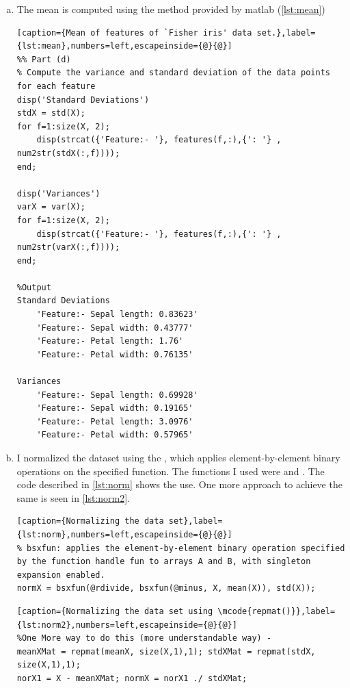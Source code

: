 \documentclass[a4paper, 11pt]{article}
\begin{document}
\begin{enumerate}[(a)]
\begin{lstlisting}[caption={Mean of features of `Fisher iris' data set.},label={lst:mean},numbers=left,escapeinside={@}{@}]
%Output
Mean
    'Feature:- Sepal length: 5.9001'
    'Feature:- Sepal width: 3.0989'
    'Feature:- Petal length: 3.8196'
    'Feature:- Petal width: 1.2526'
\end{lstlisting}

\item The mean is computed using the  method provided by matlab (\autoref{lst:mean})
\vspace{-20pt}
\begin{lstlisting}[caption={Mean of features of `Fisher iris' data set.},label={lst:mean},numbers=left,escapeinside={@}{@}]
%% Part (d)
% Compute the variance and standard deviation of the data points for each feature
disp('Standard Deviations')
stdX = std(X);
for f=1:size(X, 2);
    disp(strcat({'Feature:- '}, features(f,:),{': '} , num2str(stdX(:,f))));
end;

disp('Variances')
varX = var(X);
for f=1:size(X, 2);
    disp(strcat({'Feature:- '}, features(f,:),{': '} , num2str(varX(:,f))));
end;

%Output
Standard Deviations
    'Feature:- Sepal length: 0.83623'
    'Feature:- Sepal width: 0.43777'
    'Feature:- Petal length: 1.76'
    'Feature:- Petal width: 0.76135'

Variances
    'Feature:- Sepal length: 0.69928'
    'Feature:- Sepal width: 0.19165'
    'Feature:- Petal length: 3.0976'
    'Feature:- Petal width: 0.57965'
\end{lstlisting}

\item I normalized the dataset using the , which applies element-by-element binary operations on the specified function. The functions I used were  and . The code described in \autoref{lst:norm} shows the use. One more approach to achieve the same is seen in \autoref{lst:norm2}.
\vspace{-20pt}
\begin{lstlisting}[caption={Normalizing the data set},label={lst:norm},numbers=left,escapeinside={@}{@}]
% bsxfun: applies the element-by-element binary operation specified by the function handle fun to arrays A and B, with singleton expansion enabled.
normX = bsxfun(@rdivide, bsxfun(@minus, X, mean(X)), std(X));
\end{lstlisting}
\vspace{-20pt}
\begin{lstlisting}[caption={Normalizing the data set using \mcode{repmat()}},label={lst:norm2},numbers=left,escapeinside={@}{@}]
%One More way to do this (more understandable way) -
meanXMat = repmat(meanX, size(X,1),1); stdXMat = repmat(stdX, size(X,1),1);
norX1 = X - meanXMat; normX = norX1 ./ stdXMat;
\end{lstlisting}


\end{enumerate}
\end{document}
